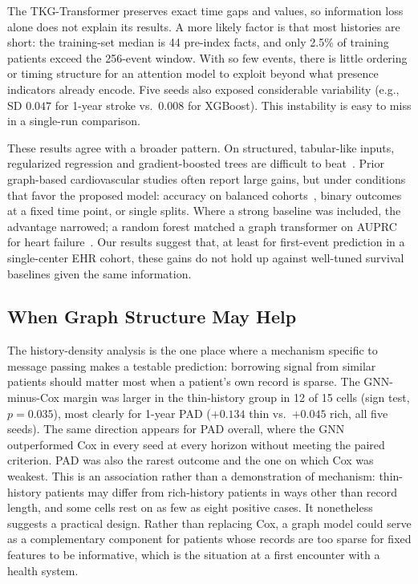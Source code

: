 The TKG-Transformer preserves exact time gaps and values, so information loss alone does not explain its results. A more likely factor is that most histories are short: the training-set median is 44 pre-index facts, and only 2.5\% of training patients exceed the 256-event window. With so few events, there is little ordering or timing structure for an attention model to exploit beyond what presence indicators already encode. Five seeds also exposed considerable variability (e.g., SD $0.047$ for 1-year stroke vs.\ $0.008$ for XGBoost). This instability is easy to miss in a single-run comparison.

These results agree with a broader pattern. On structured, tabular-like inputs, regularized regression and gradient-boosted trees are difficult to beat~\cite{christodoulou2019systematic,grinsztajn2022tree}. Prior graph-based cardiovascular studies often report large gains, but under conditions that favor the proposed model: accuracy on balanced cohorts~\cite{lu2021weighted}, binary outcomes at a fixed time point, or single splits. Where a strong baseline was included, the advantage narrowed; a random forest matched a graph transformer on AUPRC for heart failure~\cite{boll2024graph}. Our results suggest that, at least for first-event prediction in a single-center EHR cohort, these gains do not hold up against well-tuned survival baselines given the same information.

\subsection{When Graph Structure May Help}
\label{sec:disc-when}

The history-density analysis is the one place where a mechanism specific to message passing makes a testable prediction: borrowing signal from similar patients should matter most when a patient's own record is sparse. The GNN-minus-Cox margin was larger in the thin-history group in 12 of 15 cells (sign test, $p=0.035$), most clearly for 1-year PAD ($+0.134$ thin vs.\ $+0.045$ rich, all five seeds). The same direction appears for PAD overall, where the GNN outperformed Cox in every seed at every horizon without meeting the paired criterion. PAD was also the rarest outcome and the one on which Cox was weakest.
This is an association rather than a demonstration of mechanism: thin-history patients may differ from rich-history patients in ways other than record length, and some cells rest on as few as eight positive cases. It nonetheless suggests a practical design. Rather than replacing Cox, a graph model could serve as a complementary component for patients whose records are too sparse for fixed features to be informative, which is the situation at a first encounter with a health system.

